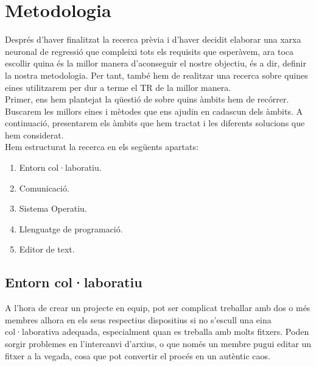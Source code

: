 \chapter{Metodologia}
\label{c:Metodologia}

Després d'haver finalitzat la recerca prèvia i d'haver decidit elaborar una xarxa neuronal de regressió que compleixi tots els requisits que esperàvem, ara toca escollir quina és la millor manera d'aconseguir el nostre objectiu, és a dir, definir la nostra metodologia. Per tant, també hem de realitzar una recerca sobre quines eines utilitzarem per dur a terme el TR de la millor manera.\\[0.2cm]
Primer, ens hem plantejat la qüestió de sobre quins àmbits hem de recórrer. Buscarem les millors eines i mètodes que ens ajudin en cadascun dels àmbits. A continuació, presentarem els àmbits que hem tractat i les diferents solucions que hem considerat.\\[0.2cm]
Hem estructurat la recerca en els següents apartats:
\begin{enumerate}
 \item Entorn col·laboratiu.
 \item Comunicació.
 \item Sistema Operatiu.
 \item Llenguatge de programació.
 \item Editor de text.
\end{enumerate}
%


\section{Entorn col·laboratiu}\label{sec:4.3}
A l’hora de crear un projecte en equip, pot ser complicat treballar amb dos o més membres alhora en els seus respectius dispositius si no s’escull una eina col·laborativa adequada, especialment quan es treballa amb molts fitxers. Poden sorgir problemes en l’intercanvi d’arxius, o que només un membre pugui editar un fitxer a la vegada, cosa que pot convertir el procés en un autèntic caos.


